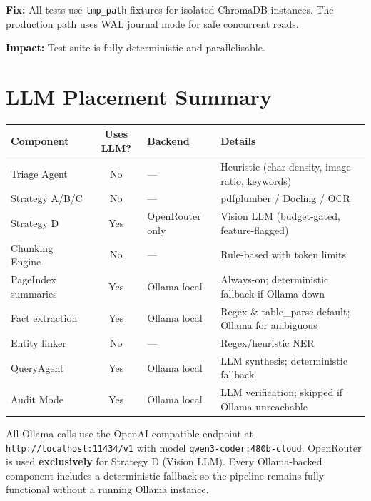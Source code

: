 \documentclass[12pt,a4paper]{article}
\begin{document}
\textbf{Fix:} All tests use \texttt{tmp\_path} fixtures for isolated
ChromaDB instances.  The production path uses WAL journal mode for
safe concurrent reads.

\textbf{Impact:} Test suite is fully deterministic and parallelisable.


\section{LLM Placement Summary}

\begin{center}
\begin{tabular}{lcll}
\toprule
\textbf{Component} & \textbf{Uses LLM?} & \textbf{Backend} & \textbf{Details} \\
\midrule
Triage Agent        & No   & ---             & Heuristic (char density, image ratio, keywords) \\
Strategy A/B/C      & No   & ---             & pdfplumber / Docling / OCR \\
Strategy D          & Yes  & OpenRouter only & Vision LLM (budget-gated, feature-flagged) \\
Chunking Engine     & No   & ---             & Rule-based with token limits \\
PageIndex summaries & Yes  & Ollama local    & Always-on; deterministic fallback if Ollama down \\
Fact extraction     & Yes  & Ollama local    & Regex \& table\_parse default; Ollama for ambiguous \\
Entity linker       & No   & ---             & Regex/heuristic NER \\
QueryAgent          & Yes  & Ollama local    & LLM synthesis; deterministic fallback \\
Audit Mode          & Yes  & Ollama local    & LLM verification; skipped if Ollama unreachable \\
\bottomrule
\end{tabular}
\end{center}

\noindent All Ollama calls use the OpenAI-compatible endpoint at
\texttt{http://localhost:11434/v1} with model \texttt{qwen3-coder:480b-cloud}.
OpenRouter is used \textbf{exclusively} for Strategy D (Vision LLM).
Every Ollama-backed component includes a deterministic fallback so the
pipeline remains fully functional without a running Ollama instance.
\end{document}
